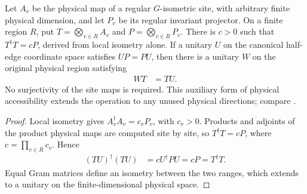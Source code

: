 \begin{lemma}%
    \label{thm:peps_regular_physical_unitary_transport}
    \leanok
    Let $A_v$ be the physical map of a regular $G$-isometric site,
    with arbitrary finite physical dimension, and let $P_v$ be its
    regular invariant projector. On a finite region $R$, put
    $T=\bigotimes_{v\in R}A_v$ and $P=\bigotimes_{v\in R}P_v$.
    There is $c>0$ such that $T^\dagger T=cP$, derived from local
    isometry alone. If a unitary $U$ on the canonical half-edge coordinate space
    satisfies $UP=PU$, then there is a unitary $W$ on the original
    physical region satisfying
    \begin{align}
        WT & =TU.
    \end{align}
    No surjectivity of the site maps is required. This auxiliary
    form of physical accessibility extends the operation to any unused
    physical directions; compare \cite[Lemma~6.3 and \S6.2]{Schuch2010PEPS}.
\end{lemma}
\begin{proof}\leanok
    Local isometry gives $A_v^\dagger A_v=c_vP_v$, with $c_v>0$.
    Products and adjoints of the product physical maps are computed
    site by site, so $T^\dagger T=cP$, where $c=\prod_{v\in R}c_v$.
    Hence
    \begin{align}
        (TU)^\dagger(TU) & =cU^\dagger PU=cP=T^\dagger T.
    \end{align}
    Equal Gram matrices define an isometry between the two ranges,
    which extends to a unitary on the finite-dimensional physical space.
\end{proof}

